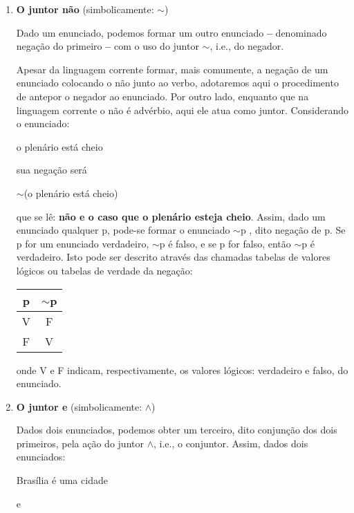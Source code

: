\begin{enumerate}[label=\textbf{(\arabic*)}]
    \item \textbf{O juntor não} (simbolicamente: $\sim$)

    Dado um enunciado, podemos formar um outro enunciado \textbf{--} denominado negação do primeiro \textbf{--} com o uso do juntor $\sim$, i.e., do negador.

    Apesar da linguagem corrente formar, mais comumente, a negação de um enunciado colocando o não junto ao verbo, adotaremos aqui o procedimento de antepor o negador ao enunciado.
    Por outro lado, enquanto que na linguagem corrente o não é advérbio, aqui ele atua como juntor.
    Considerando o enunciado:

    \begin{center}
        o plenário está cheio
    \end{center}
    sua negação será
    \begin{center}
        $\sim$(o plenário está cheio)
    \end{center}
    que se lê: \textbf{não e o caso que o plenário esteja cheio}.
    Assim, dado um enunciado qualquer p, pode-se formar o enunciado $\sim$p , dito negação de p.
    Se p for um enunciado verdadeiro, $\sim$p é falso, e se p for falso, então $\sim$p é verdadeiro.
    Isto pode ser descrito através das chamadas tabelas de valores lógicos ou tabelas de verdade da negação:

    \begin{center}
        \begin{tabular}{c c}
            p & $\sim$p \\ \hline
            V & F \\
            F & V
        \end{tabular}
    \end{center}

    onde V e F indicam, respectivamente, os valores lógicos: verdadeiro e falso, do enunciado.

    \item \textbf{O juntor e} (simbolicamente: $\land$)

    Dados dois enunciados, podemos obter um terceiro, dito conjunção dos dois primeiros, pela ação do juntor $\land$, i.e., o conjuntor.
    Assim, dados dois enunciados:

    \begin{center}
        Brasília é uma cidade

        e


\end{center}
\end{enumerate}

